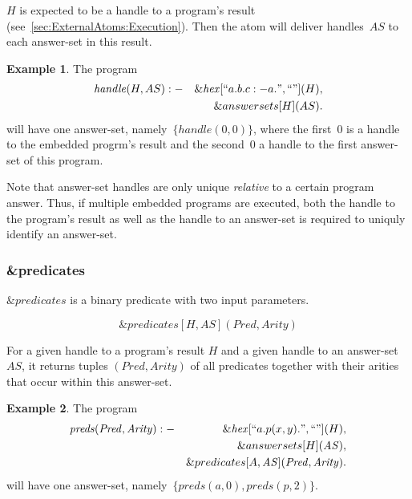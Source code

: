 \documentclass[a4paper,11pt]{article}
\theoremstyle{definition}
\newtheorem{example}{Example}
\newenvironment{mathprogram}[1][P]
	{
		\renewcommand{\ruleimplication}{&:-&}
		\newcommand{\ruledelimiter}{1}
		\begin{eqnarray*}
	}
	{
		\end{eqnarray*}
	}
\newcommand{\ruleimplication}{\ensuremath{\mathit{:-}}}
\begin{document}
				$H$ is expected to be a handle to a program's result (see~\ref{sec:ExternalAtoms:Execution}). Then the atom will deliver handles~$\mathit{AS}$ to each answer-set in this result.

				\begin{example}
					\label{ex:answersets}
					The program
					\begin{mathprogram}
\mathit{handle}(H, AS) \ruleimplication \mathit{\&hex}[``a. b. c :- a.", ``"](H), \\
						&&				\&answersets[H](AS).
					\end{mathprogram}
					will have one answer-set, namely~$\{ handle(0,0) \}$, where the first~$0$ is a handle to the embedded progrm's result and the second~$0$ a handle to the first answer-set
					of this program.
				\end{example}
				
				Note that answer-set handles are only unique \emph{relative} to a certain program answer. Thus, if multiple embedded programs are executed, both the handle to the program's result
				as well as the handle to an answer-set is required to uniquly identify an answer-set.

				
			\subsubsection{\&predicates}

				$\mathit{\&predicates}$ is a binary predicate with two input parameters.
				
					$$\mathit{\&predicates}[H, \mathit{AS}](\mathit{Pred}, \mathit{Arity})$$
					
				For a given handle to a program's result $H$ and a given handle to an answer-set $\mathit{AS}$, it returns tuples $(\mathit{Pred}, \mathit{Arity})$ of all predicates together with
				their arities that occur within this answer-set.

				\begin{example}
					\label{ex:predicates}
					The program
					\begin{mathprogram}
\mathit{preds}(\mathit{Pred}, \mathit{Arity}) \ruleimplication \mathit{\&hex}[``a. p(x,y).", ``"](H), \\
					&&											\&answersets[H](\mathit{AS}), \\
					&&											\&predicates[A, \mathit{AS}](\mathit{Pred}, \mathit{Arity}).
					\end{mathprogram}
					will have one answer-set, namely~$\{ preds(a,0), preds(p,2) \}$.
				\end{example}
				
\end{document}
